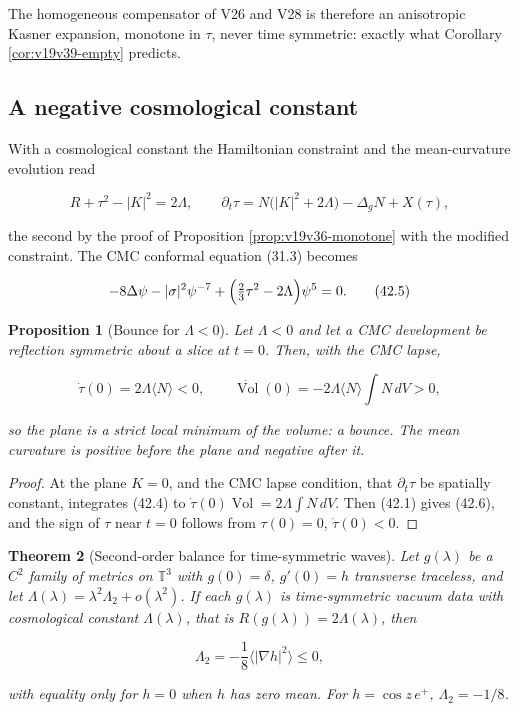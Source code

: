 \documentclass[11pt]{article}
\newtheorem{theorem}{Theorem}[section]
\newtheorem{proposition}[theorem]{Proposition}
\theoremstyle{remark}
\begin{document}
The homogeneous compensator of V26 and V28 is therefore an anisotropic
Kasner expansion, monotone in \(\tau\), never time symmetric: exactly
what Corollary \ref{cor:v19v39-empty} predicts.

\subsection{A negative cosmological constant}

With a cosmological constant the Hamiltonian constraint and the
mean-curvature evolution read

\[
 R+\tau^2-|K|^2=2\Lambda,\qquad
 \partial_t\tau=N\bigl(|K|^2+2\Lambda\bigr)-\Delta_gN+X(\tau),         \tag{42.4}
\]

the second by the proof of Proposition \ref{prop:v19v36-monotone}
with the modified constraint.  The CMC conformal equation (31.3)
becomes

\[
 -8\Delta\psi-|\sigma|^2\psi^{-7}+\Bigl(\tfrac23\tau^2-2\Lambda\Bigr)\psi^5=0.
                                                                    \tag{42.5}
\]

\begin{proposition}[Bounce for \(\Lambda<0\)]
\label{prop:v19v39-bounce}
Let \(\Lambda<0\) and let a CMC development be reflection symmetric
about a slice at \(t=0\).  Then, with the CMC lapse,

\[
 \dot\tau(0)=2\Lambda\langle N\rangle<0,\qquad
 \ddot{\operatorname{Vol}}(0)=-2\Lambda\langle N\rangle\int N\,dV>0,   \tag{42.6}
\]

so the plane is a strict local minimum of the volume: a bounce.  The
mean curvature is positive before the plane and negative after it.
\end{proposition}

\begin{proof}
At the plane \(K=0\), and the CMC lapse condition, that
\(\partial_t\tau\) be spatially constant, integrates (42.4) to
\(\dot\tau(0)\operatorname{Vol}=2\Lambda\int N\,dV\).  Then (42.1) gives
(42.6), and the sign of \(\tau\) near \(t=0\) follows from
\(\tau(0)=0\), \(\dot\tau(0)<0\).
\end{proof}

\begin{theorem}[Second-order balance for time-symmetric waves]
\label{thm:v19v39-balance}
Let \(g(\lambda)\) be a \(C^2\) family of metrics on \(\mathbb T^3\)
with \(g(0)=\delta\), \(g'(0)=h\) transverse traceless, and let
\(\Lambda(\lambda)=\lambda^2\Lambda_2+o(\lambda^2)\).  If each
\(g(\lambda)\) is time-symmetric vacuum data with cosmological constant
\(\Lambda(\lambda)\), that is \(R(g(\lambda))=2\Lambda(\lambda)\), then

\[
 \Lambda_2=-\frac18\bigl\langle|\nabla h|^2\bigr\rangle\leq0,          \tag{42.7}
\]

with equality only for \(h=0\) when \(h\) has zero mean.  For
\(h=\cos z\,e^+\), \(\Lambda_2=-1/8\).
\end{theorem}
\end{document}
